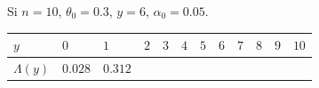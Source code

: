 \documentclass[
  12pt,
]{book}
\begin{document}
Si \(n=10\), \(\theta_0 = 0.3\), \(y = 6\), \(\alpha_0=0.05\).

\begin{longtable}[]{@{}llllllllllll@{}}
\toprule
\begin{minipage}[b]{0.03\columnwidth}\raggedright
\(y\)\strut
\end{minipage} & \begin{minipage}[b]{0.06\columnwidth}\raggedright
\(0\)\strut
\end{minipage} & \begin{minipage}[b]{0.06\columnwidth}\raggedright
\(1\)\strut
\end{minipage} & \begin{minipage}[b]{0.06\columnwidth}\raggedright
\(2\)\strut
\end{minipage} & \begin{minipage}[b]{0.06\columnwidth}\raggedright
\(3\)\strut
\end{minipage} & \begin{minipage}[b]{0.06\columnwidth}\raggedright
\(4\)\strut
\end{minipage} & \begin{minipage}[b]{0.06\columnwidth}\raggedright
\(5\)\strut
\end{minipage} & \begin{minipage}[b]{0.06\columnwidth}\raggedright
\(6\)\strut
\end{minipage} & \begin{minipage}[b]{0.06\columnwidth}\raggedright
\(7\)\strut
\end{minipage} & \begin{minipage}[b]{0.06\columnwidth}\raggedright
\(8\)\strut
\end{minipage} & \begin{minipage}[b]{0.05\columnwidth}\raggedright
\(9\)\strut
\end{minipage} & \begin{minipage}[b]{0.05\columnwidth}\raggedright
\(10\)\strut
\end{minipage}\tabularnewline
\midrule
\endhead
\begin{minipage}[t]{0.03\columnwidth}\raggedright
\(\Lambda(y)\)\strut
\end{minipage} & \begin{minipage}[t]{0.06\columnwidth}\raggedright
\(0.028\)\strut
\end{minipage} & \begin{minipage}[t]{0.06\columnwidth}\raggedright
\(0.312\)\strut
\end{minipage} & \begin{minipage}[t]{0.06\columnwidth}\raggedright

\end{minipage}
\end{longtable}
\end{document}
